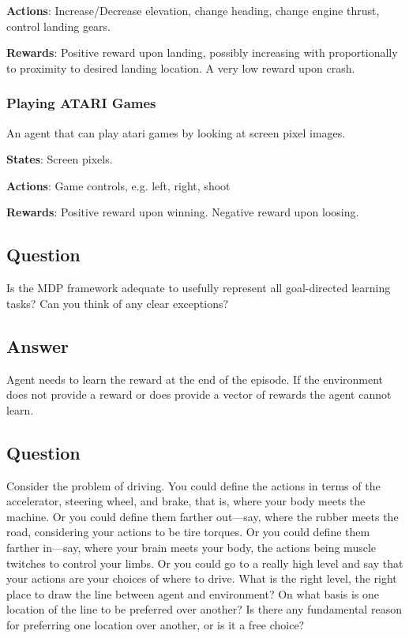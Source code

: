 \documentclass[11pt]{article}
\begin{document}
    \textbf{Actions}: Increase/Decrease elevation, change heading, change engine thrust, control landing gears.

    \textbf{Rewards}: Positive reward upon landing, possibly increasing with proportionally to proximity to desired landing location.
    A very low reward upon crash.

    \subsubsection*{Playing ATARI Games}

    An agent that can play atari games by looking at screen pixel images.

    \textbf{States}: Screen pixels.

    \textbf{Actions}: Game controls, e.g. left, right, shoot

    \textbf{Rewards}: Positive reward upon winning.
    Negative reward upon loosing.

    \subsection{Question}
    Is the MDP framework adequate to usefully represent all goal-directed learning tasks?
    Can you think of any clear exceptions?

    \subsection*{Answer}
    Agent needs to learn the reward at the end of the episode.
    If the environment does not provide a reward or does provide a vector of rewards the agent cannot learn.

    \subsection{Question}
    Consider the problem of driving.
    You could define the actions in terms of the accelerator, steering wheel, and brake, that is, where your body meets the machine.
    Or you could define them farther out—say, where the rubber meets the road, considering your actions to be tire torques.
    Or you could define them farther in—say, where your brain meets your body, the actions being muscle twitches to control your limbs.
    Or you could go to a really high level and say that your actions are your choices of where to drive.
    What is the right level, the right place to draw the line between agent and environment?
    On what basis is one location of the line to be preferred over another?
    Is there any fundamental reason for preferring one location over another, or is it a free choice?
\end{document}
